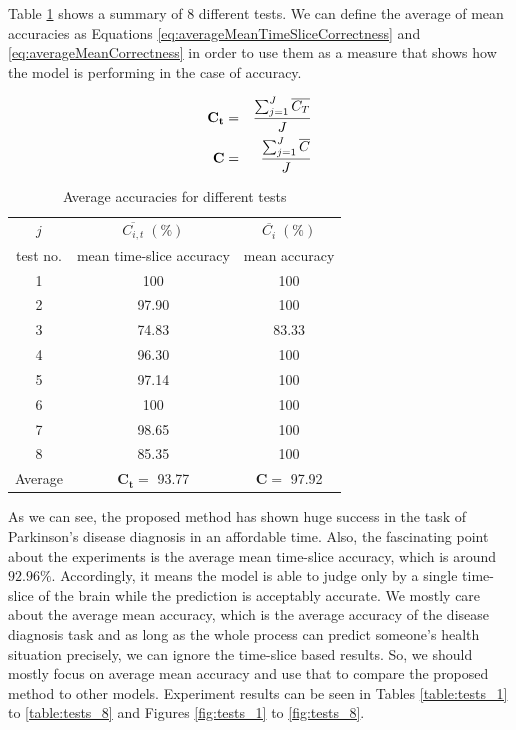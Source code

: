 \documentclass[a4paper,fleqn]{cas-dc}
\begin{document}
Table \ref{table:averageAccuracies} shows a summary of 8 different tests. We can define the average of mean accuracies as Equations \eqref{eq:averageMeanTimeSliceCorrectness} and \eqref{eq:averageMeanCorrectness} in order to use them as a measure that shows how the model is performing in the case of accuracy. 

\begin{eqnarray}
\label{eq:averageMeanTimeSliceCorrectness}
\mathbf{C_t} &=& {{\sum_{j=1}^{J} \overline{C_{T}} } \over {J} } \\ 
\label{eq:averageMeanCorrectness}
\mathbf{C} &=& {{\sum_{j=1}^{J} \overline{C} } \over {J} } 
\end{eqnarray}


\begin{table}
	\caption{Average accuracies for different tests}
	\begin{tabular}{| c | c | c| }
		\hline
		$j$ & $\overline{C_{i,t}}\;(\%)$ & $\overline{C_i}\;(\%)$ \\ 
		test no. & mean time-slice accuracy & mean accuracy \\ \hline
		1 & 100 & 100 \\
		2 & 97.90 & 100 \\
		3 & 74.83 & 83.33 \\
		4 & 96.30 & 100 \\
		5 & 97.14 & 100 \\
		6 & 100 & 100 \\
		7 & 98.65 & 100 \\
		8 & 85.35 & 100 \\ \hline
		Average & $\mathbf{C_t} = $ 93.77 & $\mathbf{C} = $ 97.92 \\
		\hline
	\end{tabular}
\label{table:averageAccuracies}
\end{table}

As we can see, the proposed method has shown huge success in the task of Parkinson's disease diagnosis in an affordable time. Also, the fascinating point about the experiments is the average mean time-slice accuracy, which is around $92.96\%$. Accordingly, it means the model is able to judge only by a single time-slice of the brain while the prediction is acceptably accurate. We mostly care about the average mean accuracy, which is the average accuracy of the disease diagnosis task and as long as the whole process can predict someone's health situation precisely, we can ignore the time-slice based results. So, we should mostly focus on average mean accuracy and use that to compare the proposed method to other models. Experiment results can be seen in Tables \ref{table:tests_1} to \ref{table:tests_8} and Figures \ref{fig:tests_1} to  \ref{fig:tests_8}.
\end{document}
